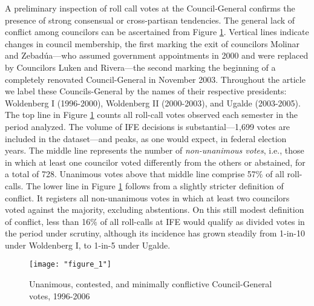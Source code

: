 \documentclass[12 pt, letter]{article}
\begin{document}
A preliminary inspection of roll call votes at the Council-General confirms the presence of strong consensual or cross-partisan tendencies.  The general lack of conflict among councilors can be ascertained from Figure \ref{F:unan}.  Vertical lines indicate changes in council membership, the first marking the exit of councilors Molinar and Zebad\'ua---who assumed government appointments in 2000 and were replaced by Councilors Luken and Rivera---the second marking the beginning of a completely renovated Council-General in November 2003.  Throughout the article we label these Councils-General by the names of their respective presidents: Woldenberg I (1996-2000), Woldenberg II (2000-2003), and Ugalde (2003-2005).  The top line in Figure \ref{F:unan} counts all roll-call votes observed each semester in the period analyzed.  The volume of IFE decisions is substantial---1,699 votes are included in the dataset---and peaks, as one would expect, in federal election years.  The middle line represents the number of \emph{non-unanimous votes}, i.e., those in which at least one councilor voted differently from the others or abstained, for a total of 728.  Unanimous votes above that middle line comprise 57\% of all roll-calls. The lower line in Figure \ref{F:unan} follows from a slightly stricter definition of conflict.  It registers all non-unanimous votes in which at least two councilors voted against the majority, excluding abstentions.  On this still modest definition of conflict, less than 16\% of all roll-calls at IFE would qualify as divided votes in the period under scrutiny, although its incidence has grown steadily from 1-in-10 under Woldenberg I, to 1-in-5 under Ugalde.

\begin{figure}
\begin{center}
   \caption{Unanimous, contested, and minimally conflictive Council-General votes, 1996-2006}\label{F:unan}
   \texttt{[image: "figure\_1"]}
\end{center}
\end{figure}
\end{document}
